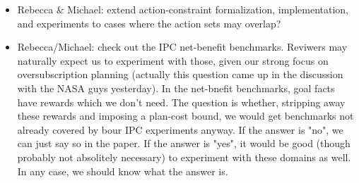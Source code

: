 \documentclass{article}
\begin{document}

\begin{itemize}
\item Rebecca \& Michael: extend action-constraint formalization, implementation, and experiments to cases where the action sets may overlap?
\item Rebecca/Michael: check out the IPC net-benefit benchmarks. Reviwers may naturally expect us to experiment with those, given our strong focus on oversubscription planning (actually this question came up in the discussion with the NASA guys yesterday). In the net-bnefit benchmarks, goal facts have rewards which we don't need. The question is whether, stripping away these rewards and imposing a plan-cost bound, we would get benchmarks not already covered by bour IPC experiments anyway. If the answer is "no", we can just say so in the paper. If the answer is "yes", it would be good (though probably not absolitely necessary) to experiment with these domains as well. In any case, we should know what the answer is.

\end{itemize}
\end{document}
